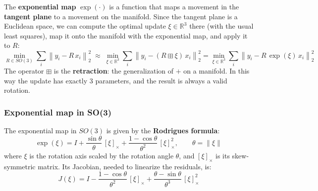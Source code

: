 \vspace{6pt}The \textbf{exponential map} $\exp(\cdot)$ is a function that maps a movement in the \textbf{tangent plane} to a movement on the manifold.
Since the tangent plane is a Euclidean space, we can compute the optimal update $\xi \in \mathbb{R}^3$ there (with the usual least squares), map it onto the manifold with the exponential map, and apply it to $R$:
\[
\min_{R \in SO(3)} \sum_i \left\| y_i - R\, x_i \right\|_2^2 \;\approx\; \min_{\xi \in \mathbb{R}^3} \sum_i \left\| y_i - (R \boxplus \xi)\, x_i \right\|_2^2 = \min_{\xi \in \mathbb{R}^3} \sum_i \left\| y_i - R\, \exp(\xi)\, x_i \right\|_2^2
\]
The operator $\boxplus$ is the \textbf{retraction}: the generalization of $+$ on a manifold.
In this way the update has exactly 3 parameters, and the result is always a valid rotation.

\subsubsection{Exponential map in SO(3)}
The exponential map in $SO(3)$ is given by the \textbf{Rodrigues formula}:
\[
\exp(\xi) = I + \frac{\sin\theta}{\theta}\, [\xi]_\times + \frac{1 - \cos\theta}{\theta^2}\, [\xi]_\times^2, \qquad \theta = \|\xi\|
\]
where $\xi$ is the rotation axis scaled by the rotation angle $\theta$, and $[\xi]_\times$ is its skew-symmetric matrix.
Its Jacobian, needed to linearize the residuals, is:
\[
J(\xi) = I - \frac{1 - \cos\theta}{\theta^2}\, [\xi]_\times + \frac{\theta - \sin\theta}{\theta^3}\, [\xi]_\times^2
\]

